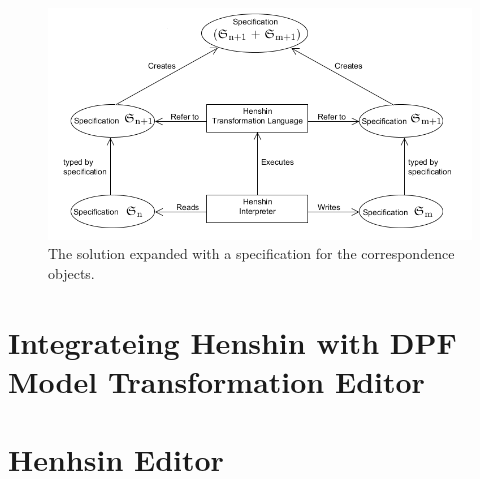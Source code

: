 \begin{figure}[H]
	\centering
	\includegraphics[scale=0.7]{./Figures/TransformationSolution_Correspond.png}
	\caption[Specification for the correspondence objects]
	{The solution expanded with a specification for the correspondence objects.}
	\label{fig:Solution_CorrespondanceObjects}
\end{figure}




\section{Integrateing Henshin with DPF Model Transformation Editor}

\section{Henhsin Editor}



